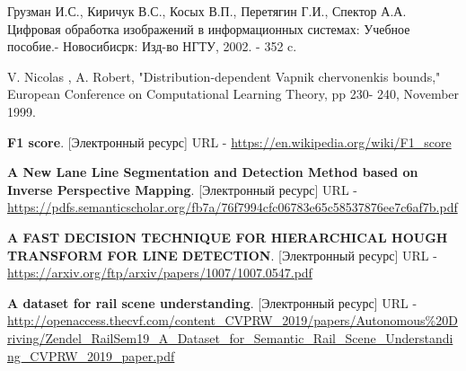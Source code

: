 \begin{thebibliography}{2}
	Грузман И.С., Киричук В.С., Косых В.П., Перетягин Г.И., Спектор А.А. Цифровая обработка изображений в информационных системах: Учебное пособие.- Новосибисрк: Изд-во НГТУ, 2002. - 352 c.
	
	V. Nicolas , A. Robert, "Distribution-dependent Vapnik chervonenkis
	bounds," European Conference on Computational Learning Theory, pp 230-
	240, November 1999.
	
	\textbf{F1 score}. [Электронный ресурс] URL - 
	\href{https://en.wikipedia.org/wiki/F1_score}{https://en.wikipedia.org/wiki/F1\_score}
	
	\textbf{A New Lane Line Segmentation and Detection Method based on Inverse
		Perspective Mapping}. [Электронный ресурс] URL - 
	\href{https://pdfs.semanticscholar.org/fb7a/76f7994cfc06783e65c58537876ee7c6af7b.pdf}{https://pdfs.semanticscholar.org/fb7a/76f7994cfc06783e65c58537876ee7c6af7b.pdf}
	
	\textbf{A FAST DECISION TECHNIQUE FOR HIERARCHICAL HOUGH
		TRANSFORM FOR LINE DETECTION}. [Электронный ресурс] URL - 
	\href{https://arxiv.org/ftp/arxiv/papers/1007/1007.0547.pdf}{https://arxiv.org/ftp/arxiv/papers/1007/1007.0547.pdf}
	
	\textbf{A dataset for rail scene understanding}. [Электронный ресурс] URL - 
	\href{http://openaccess.thecvf.com/content_CVPRW_2019/papers/Autonomous\%20Driving/Zendel_RailSem19_A_Dataset_for_Semantic_Rail_Scene_Understanding_CVPRW_2019_paper.pdf}{http://openaccess.thecvf.com/content\_CVPRW\_2019/papers/Autonomous\%20Driving/Zendel\_RailSem19\_A\_Dataset\_for\_Semantic\_Rail\_Scene\_Understanding\_CVPRW\_2019\_paper.pdf}
	
\end{thebibliography}		  		 		